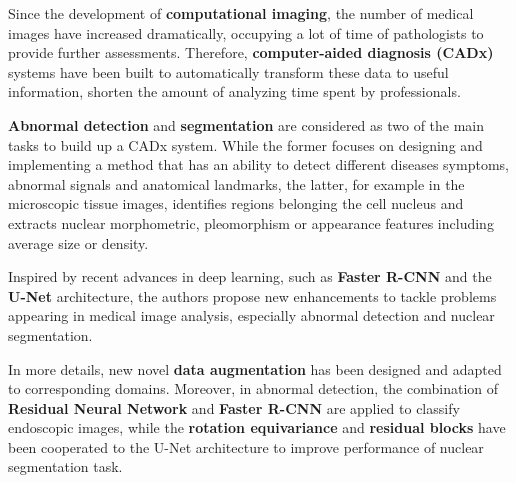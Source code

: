 \begin{EnAbstract}

\vspace*{1cm}

Since the development of \textbf{computational imaging}, the number of medical images have increased dramatically, occupying a lot of time of pathologists to provide further assessments. Therefore, \textbf{computer-aided diagnosis (CADx)} systems have been built to automatically transform these data to useful information, shorten the amount of analyzing time spent by professionals. 

\textbf{Abnormal detection} and \textbf{segmentation} are considered as two of the main tasks to build up a CADx system. While the former focuses on designing and implementing a method that has an ability to detect different diseases symptoms, abnormal signals and anatomical landmarks, the latter, for example in the microscopic tissue images, identifies regions belonging the cell nucleus and extracts nuclear morphometric, pleomorphism or appearance features including average size or density.


Inspired by recent advances in deep learning, such as \textbf{Faster R-CNN} and the\textbf{ U-Net} architecture, the authors propose new enhancements to tackle problems appearing in medical image analysis, especially abnormal detection and nuclear segmentation. 

In more details, new novel \textbf{data augmentation} has been designed and adapted to corresponding domains. Moreover, in abnormal detection, the combination of \textbf{Residual Neural Network} and \textbf{Faster R-CNN} are applied to classify endoscopic images, while the \textbf{rotation equivariance} and \textbf{residual blocks} have been cooperated to the U-Net architecture to improve performance of nuclear segmentation task. 


\end{EnAbstract}
